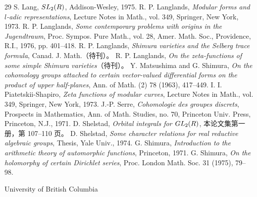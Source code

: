 \begin{thebibliography}{29}
 S. Lang, \emph{$SL_2(R)$}, Addison-Wesley, 1975.
 R. P. Langlands, \emph{Modular forms and $l$-adic representations}, Lecture Notes in Math., vol. 349, Springer, New York, 1973.
 R. P. Langlands, \emph{Some contemporary problems with origins in the Jugendtraum}, Proc. Sympos. Pure Math., vol. 28, Amer. Math. Soc., Providence, R.I., 1976, pp. 401--418.
 R. P. Langlands, \emph{Shimura varieties and the Selberg trace formula}, Canad. J. Math.（待刊）。
 R. P. Langlands, \emph{On the zeta-functions of some simple Shimura varieties}（待刊）。
 Y. Matsushima and G. Shimura, \emph{On the cohomology groups attached to certain vector-valued differential forms on the product of upper half-planes}, Ann. of Math. (2) 78 (1963), 417--449.
 I. I. Piatetskii-Shapiro, \emph{Zeta functions of modular curves}, Lecture Notes in Math., vol. 349, Springer, New York, 1973.
 J.-P. Serre, \emph{Cohomologie des groupes discrets}, Prospects in Mathematics, Ann. of Math. Studies, no. 70, Princeton Univ. Press, Princeton, N.J., 1971.
 D. Shelstad, \emph{Orbital integrals for $GL_2(R)$}, 本论文集第一册，第 107--110 页。
 D. Shelstad, \emph{Some character relations for real reductive algebraic groups}, Thesis, Yale Univ., 1974.
 G. Shimura, \emph{Introduction to the arithmetic theory of automorphic functions}, Princeton, 1971.
 G. Shimura, \emph{On the holomorphy of certain Dirichlet series}, Proc. London Math. Soc. 31 (1975), 79--98.
\end{thebibliography}
\begin{flushleft}\small University of British Columbia\end{flushleft}
